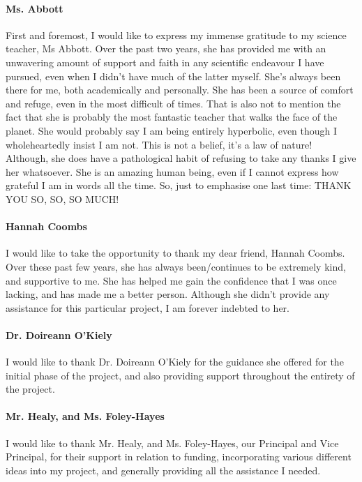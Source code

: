 \paragraph{Ms. Abbott} First and foremost, I would like to express my immense gratitude to my science teacher, Ms Abbott. Over the past two years, she has provided me with an unwavering amount of support and faith in any scientific endeavour I have pursued, even when I didn't have much of the latter myself. She’s always been there for me, both academically and personally. She has been a source of comfort and refuge, even in the most difficult of times. That is also not to mention the fact that she is probably the most fantastic teacher that walks the face of the planet. She would probably say I am being entirely hyperbolic, even though I wholeheartedly insist I am not. This is not a belief, it's a law of nature! Although, she does have a pathological habit of refusing to take any thanks I give her whatsoever. She is an amazing human being, even if I cannot express how grateful I am in words all the time. So, just to emphasise one last time:  THANK YOU SO, SO, SO MUCH!

\paragraph{Hannah Coombs} I would like to take the opportunity to thank my dear friend, Hannah Coombs. Over these past few years, she has always been/continues to be extremely kind, and supportive to me. She has helped me gain the confidence that I was once lacking, and has made me a better person. Although she didn't provide any assistance for this particular project, I am forever indebted to her.

\paragraph{Dr. Doireann O'Kiely} I would like to thank Dr. Doireann O'Kiely for the guidance she offered for the initial phase of the project, and also providing support throughout the entirety of the project.

\paragraph{Mr. Healy, and Ms. Foley-Hayes}
I would like to thank Mr. Healy, and Ms. Foley-Hayes, our Principal and Vice Principal, for their support in relation to funding, incorporating various different ideas into my project, and generally providing all the assistance I needed.

